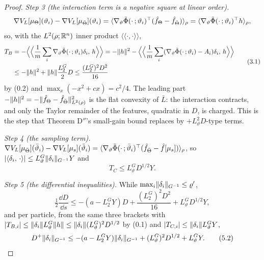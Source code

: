 \begin{proof}
\smallskip
\emph{Step 3 (the interaction term is a negative square at linear order).}
\[
  \nabla V_L[\mu_\Theta](\vartheta_i) - \nabla V_L[\mu_{\bar\Theta}](\vartheta_i)
  = \langle\nabla_\vartheta\tilde\Phi(\cdot\,;\vartheta_i)^\top(\hat f_\Theta - \hat f_{\bar\Theta})\rangle_\rho
  = \langle\nabla_\vartheta\tilde\Phi(\cdot\,;\vartheta_i)^\top h\rangle_\rho,
\]
so, with the $L^2(\rho;\mathbb{R}^n)$ inner product $\langle\langle\cdot,\cdot\rangle\rangle$,
\begin{equation}
  \begin{split}
  T_B &= -\Bigl\langle\Bigl\langle\frac1m\sum_i\nabla_\vartheta\tilde\Phi(\cdot\,;\vartheta_i)\delta_i,\,h\Bigr\rangle\Bigr\rangle
  = -\lVert h\rVert^2 - \Bigl\langle\Bigl\langle\frac1m\sum_i(\nabla_\vartheta\tilde\Phi(\cdot\,;\vartheta_i) - A_i)\delta_i,\,h\Bigr\rangle\Bigr\rangle\\
  &\le-\lVert h\rVert^2 + \lVert h\rVert\frac{L_2^G}2D\le\frac{(L_2^G)^2D^2}{16}
  \end{split}
  \tag{3.1}
\end{equation}
by (0.2) and $\max_x(-x^2 + cx) = c^2/4$. The leading part
$-\lVert h\rVert^2 = -\lVert \hat f_\Theta - \hat f_{\bar\Theta}\rVert^2_{L^2(\rho)}$ is the flat convexity of $\bar L$: the
interaction contracts, and only the Taylor remainder of the features, quadratic in $D$, is charged. This is the step
that Theorem D$''$'s small-gain bound replaces by $+L_\vartheta^2D$-type terms.

\smallskip
\emph{Step 4 (the sampling term).}
$\nabla V_L[\mu_{\bar\Theta}](\bar\vartheta_i) - \nabla V_L[\mu_s](\bar\vartheta_i)
= \langle\nabla_\vartheta\tilde\Phi(\cdot\,;\bar\vartheta_i)^\top(\hat f_{\bar\Theta} - \hat f[\mu_s])\rangle_\rho$, so
$\lvert \langle \delta_i,\, \cdot\rangle\rvert\le L_\vartheta^G\lVert \delta_i\rVert_{G^{-1}}Y$ and
\begin{equation}
  T_C\le L_\vartheta^GD^{1/2}Y.
  \tag{4.1}
\end{equation}

\smallskip
\emph{Step 5 (the differential inequalities).} While $\max_i\lVert \delta_i\rVert_{G^{-1}}\le\varrho'$,
\begin{equation}
  \tfrac12\frac{\dd D}{\dd s}\le-(a - L_2^GY)D + \frac{(L_2^G)^2D^2}{16} + L_\vartheta^GD^{1/2}Y,
  \tag{5.1}
\end{equation}
and per particle, from the same three brackets with
$\lvert T_{B,i}\rvert\le\lVert \delta_i\rVert L_\vartheta^G\lVert h\rVert\le\lVert \delta_i\rVert(L_\vartheta^G)^2D^{1/2}$ by (0.1) and
$\lvert T_{C,i}\rvert\le\lVert \delta_i\rVert L_\vartheta^GY$,
\begin{equation}
  D^+\lVert \delta_i\rVert_{G^{-1}}\le-(a - L_2^GY)\lVert \delta_i\rVert_{G^{-1}} + (L_\vartheta^G)^2D^{1/2} + L_\vartheta^GY.
  \tag{5.2}
\end{equation}


\end{proof}
